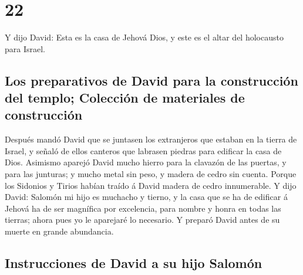 \hypertarget{section-21}{%
\section{22}\label{section-21}}

 Y dijo David: Esta es la casa de Jehová Dios, y este es
el altar del holocausto para Israel.

\hypertarget{los-preparativos-de-david-para-la-construcciuxf3n-del-templo-colecciuxf3n-de-materiales-de-construcciuxf3n}{%
\subsection{Los preparativos de David para la construcción del templo;
Colección de materiales de
construcción}\label{los-preparativos-de-david-para-la-construcciuxf3n-del-templo-colecciuxf3n-de-materiales-de-construcciuxf3n}}

 Después mandó David que se juntasen los extranjeros que
estaban en la tierra de Israel, y señaló de ellos canteros que labrasen
piedras para edificar la casa de Dios.  Asimismo aparejó
David mucho hierro para la clavazón de las puertas, y para las junturas;
y mucho metal sin peso, y madera de cedro sin cuenta. 
Porque los Sidonios y Tirios habían traído á David madera de cedro
innumerable.  Y dijo David: Salomón mi hijo es muchacho y
tierno, y la casa que se ha de edificar á Jehová ha de ser magnífica por
excelencia, para nombre y honra en todas las tierras; ahora pues yo le
aparejaré lo necesario. Y preparó David antes de su muerte en grande
abundancia.

\hypertarget{instrucciones-de-david-a-su-hijo-salomuxf3n}{%
\subsection{Instrucciones de David a su hijo
Salomón}\label{instrucciones-de-david-a-su-hijo-salomuxf3n}}

